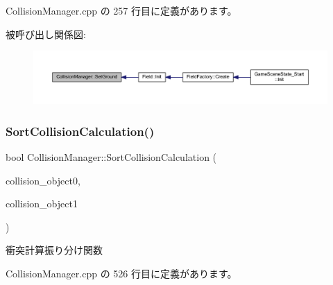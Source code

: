  Collision\+Manager.\+cpp の 257 行目に定義があります。

被呼び出し関係図\+:
\nopagebreak
\begin{figure}[H]
\begin{center}
\leavevmode
\includegraphics[width=350pt]{class_collision_manager_a63ce6003d8d042085d7b388a4cfa0666_icgraph}
\end{center}
\end{figure}
\mbox{\label{class_collision_manager_a87f64affda1906cd6eee3d177ca25045}} 
\subsubsection{\texorpdfstring{Sort\+Collision\+Calculation()}{SortCollisionCalculation()}}
{\footnotesize\ttfamily bool Collision\+Manager\+::\+Sort\+Collision\+Calculation (\begin{DoxyParamCaption}\item[{\mbox{\hyperlink{class_collision_object}{Collision\+Object}} $\ast$}]{collision\+\_\+object0,  }\item[{\mbox{\hyperlink{class_collision_object}{Collision\+Object}} $\ast$}]{collision\+\_\+object1 }\end{DoxyParamCaption})\hspace{0.3cm}{\ttfamily [private]}}



衝突計算振り分け関数 



 Collision\+Manager.\+cpp の 526 行目に定義があります。

